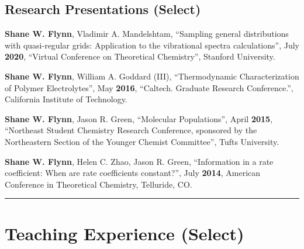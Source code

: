\documentclass[letterpaper]{article}
\renewenvironment{itemize}{
  \begin{list}{}{
    \setlength{\leftmargin}{1.5em}
  }
}{
  \end{list}
}
\begin{document}
\subsection*{Research Presentations (Select)}

\begin{itemize}

\item \textbf{Shane W. Flynn}, Vladimir A. Mandelshtam, ``Sampling general distributions
      with quasi-regular grids: Application to the vibrational spectra
      calculations'', July \textbf{2020}, ``Virtual Conference on Theoretical
      Chemistry'', Stanford University.

\item \textbf{Shane W. Flynn}, William A. Goddard (III), ``Thermodynamic
      Characterization of Polymer Electrolytes'', May \textbf{2016}, ``Caltech.
      Graduate Research Conference.'', California Institute of Technology.

\item \textbf{Shane W. Flynn}, Jason R. Green, ``Molecular Populations'', April
      \textbf{2015}, ``Northeast Student Chemistry Research Conference,
      sponsored by the Northeastern Section of the Younger Chemist Committee'',
      Tufts University.

\item \textbf{Shane W. Flynn}, Helen C. Zhao, Jason R. Green, ``Information in
      a rate coefficient: When are rate coefficients constant?'', July
      \textbf{2014}, American Conference in Theoretical Chemistry, Telluride, CO.

\end{itemize}

\vspace{0.1in}
\hrule

\section*{Teaching Experience (Select)}
\end{document}
